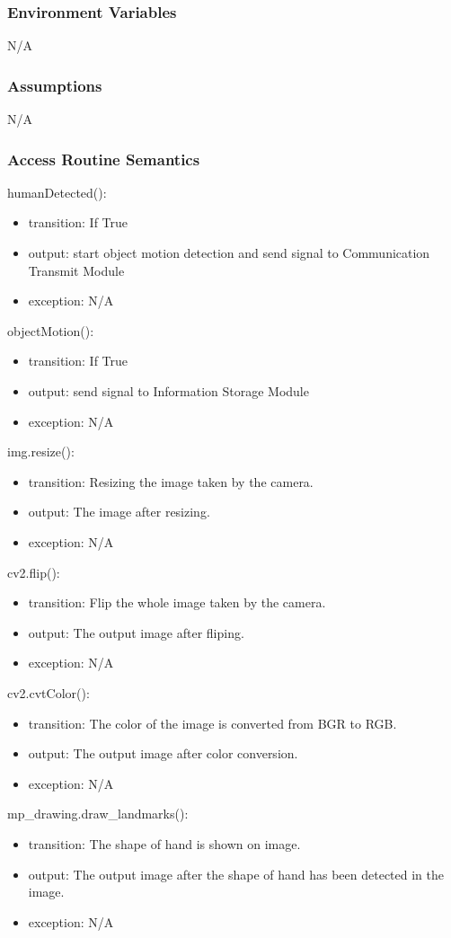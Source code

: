 \documentclass[12pt, titlepage]{article}
\begin{document}
\subsubsection{Environment Variables}

N/A


\subsubsection{Assumptions}

N/A

\subsubsection{Access Routine Semantics}

\noindent humanDetected():
\begin{itemize}
\item transition: If True 
\item output: start object motion detection and send signal to Communication Transmit Module
\item exception: N/A
\end{itemize}
\noindent objectMotion():
\begin{itemize}
\item transition: If True 
\item output: send signal to Information Storage Module 
\item exception: N/A
\end{itemize}
\noindent img.resize():
\begin{itemize}
\item transition: Resizing the image taken by the camera. 
\item output: The image after resizing.
\item exception: N/A
\end{itemize}
\noindent cv2.flip():
\begin{itemize}
\item transition: Flip the whole image taken by the camera.
\item output: The output image after fliping.
\item exception: N/A
\end{itemize}
\noindent cv2.cvtColor():
\begin{itemize}
\item transition: The color of the image is converted from BGR to RGB.
\item output: The output image after color conversion.
\item exception: N/A
\end{itemize}
\noindent mp\_drawing.draw\_landmarks():
\begin{itemize}
\item transition: The shape of hand is shown on image.
\item output: The output image after the shape of hand has been detected in the image.
\item exception: N/A
\end{itemize}
\end{document}
